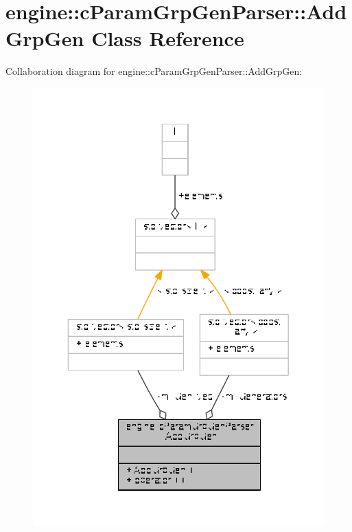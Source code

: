 \hypertarget{classengine_1_1cParamGrpGenParser_1_1AddGrpGen}{\section{engine\-:\-:c\-Param\-Grp\-Gen\-Parser\-:\-:Add\-Grp\-Gen Class Reference}
\label{classengine_1_1cParamGrpGenParser_1_1AddGrpGen}
}


Collaboration diagram for engine\-:\-:c\-Param\-Grp\-Gen\-Parser\-:\-:Add\-Grp\-Gen\-:
\nopagebreak
\begin{figure}[H]
\begin{center}
\leavevmode
\includegraphics[width=325pt]{classengine_1_1cParamGrpGenParser_1_1AddGrpGen__coll__graph}
\end{center}
\end{figure}
